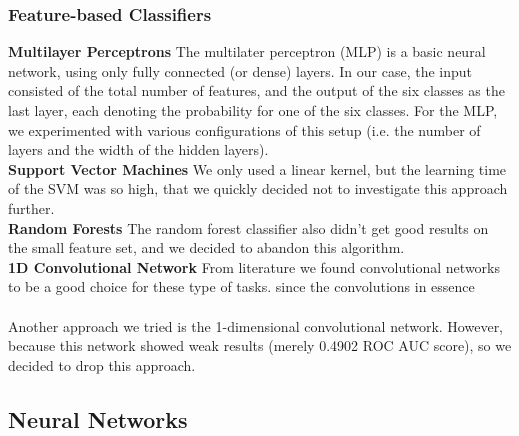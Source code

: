 \documentclass[10pt, a4paper]{article}
\begin{document}
\begin{multicols}{2}
		\subsubsection{Feature-based Classifiers}
		\label{sec:classifiers}
		\textbf{Multilayer Perceptrons}
		The multilater perceptron (MLP) is a basic neural network, using only fully connected (or dense) layers. In our case, the input consisted of the total number of features, and the output of the six classes as the last layer, each denoting the probability for one of the six classes. For the MLP, we experimented with various configurations of this setup (i.e. the number of layers and the width of the hidden layers).
		\\
		\textbf{Support Vector Machines}
		We only used a linear kernel, but the learning time of the SVM was so high, that we quickly decided not to investigate this approach further.
		\\
		\textbf{Random Forests}
		{The random forest classifier also didn't get good results on the small feature set, and we decided to abandon this algorithm.}
		\\
		\textbf{1D Convolutional Network}
		From literature we found convolutional networks to be a good choice for these type of tasks. since the convolutions in essence 
		\\
		\\
		Another approach we tried is the 1-dimensional convolutional network. However, because this network showed weak results (merely 0.4902 ROC AUC score), so we decided to drop this approach.
		
		\subsection{Neural Networks}
		

\end{multicols}
\end{document}
